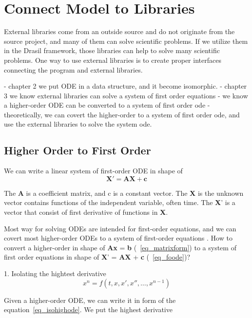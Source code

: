 \chapter{Connect Model to Libraries}
External libraries come from an outside source and do not originate from the source project, and many of them can solve scientific problems. If we utilize them in the Drasil framework, those libraries can help to solve many scientific problems. One way to use external libraries is to create proper interfaces connecting the program and external libraries.

- chapter 2 we put ODE in a data structure, and it become isomorphic.
- chapter 3 we know external libraries can solve a system of first order equations
- we know a higher-order ODE can be converted to a system of first order ode
- theoretically, we can covert the higher-order to a system of first order ode, and use the external libraries to solve the system ode.

\section{Higher Order to First Order}

We can write a linear system of first-order ODE in shape of 
\begin{equation} \label{eq_foode}
    \boldsymbol{X}' = \boldsymbol{AX} + \boldsymbol{c}
\end{equation}

The \textbf{A} is a coefficient matrix, and c is a constant vector. The \textbf{X} is the unknown vector contains functions of the independent variable, often time. The \textbf{X}' is a vector that consist of first derivative of functions in \textbf{X}.

Most way for solving ODEs are intended for first-order equations, and we can covert most higher-order ODEs to a system of first-order equations \citep{converthigherode}. How to convert a higher-order in shape of \textbf{Ax} = \textbf{b} (~\ref{eq_matrixform}) to a system of first order equations in shape of \textbf{X}' = \textbf{AX} + \textbf{c} (~\ref{eq_foode})?

1. Isolating the hightest derivative
\begin{equation} \label{eq_isohighode}
  x^n = f (t, x, x', x'', \dots, x^{n-1})
\end{equation}

Given a higher-order ODE, we can write it in form of the equation~\ref{eq_isohighode}. We put the highest derivative 

